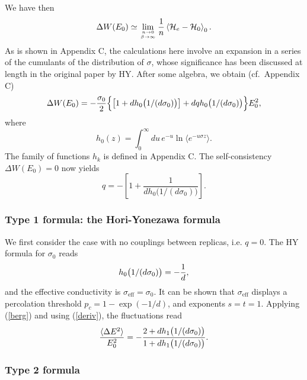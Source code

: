 We have then
\begin{equation}
\label{dwsa}
\Delta W(E_0)\simeq\lim_{n\to 0\atop \beta\to\infty}\frac{1}{n}
\left\langle
{\cal H}_e-{\cal H}_0\right\rangle_0.
\end{equation}
As is shown in Appendix C, the calculations here involve an expansion
in a series of the cumulants of the distribution of $\sigma$, whose
significance has been discussed at length in the original paper by
HY\cite{HORI77}. After some algebra, we obtain (cf.\ Appendix C)
\begin{equation}
\label{fmfodeu}
\Delta W(E_0)
=-{\sigma_0\over 2}\Bigl\{\left[1+d h_0
\bigl(1/(d\sigma_0)\bigr)\right]+d q h_0 
\bigl(1/(d\sigma_0)\bigr)\Bigr\}E_0^2,
\end{equation}
where
\begin{equation}
h_0(z)=\int_0^{\infty}du\, e^{-u}\ln\langle e^{-u\sigma z}\rangle.
\end{equation}
The family of functions $h_k$ is defined in Appendix C. 
The self-consistency $\Delta W(E_0)=0$ now yields
\begin{equation}
\label{q}
q=-\left[1+\frac{1}{d h_0
\bigl(1/(d\sigma_0)\bigr)}\right].
\end{equation}
  
\subsubsection{Type 1 formula: the Hori-Yonezawa formula}
\label{thfr}

We first consider the case with no couplings between replicas,
i.e. $q=0$. The HY formula for $\sigma_0$ reads
\begin{equation}
\label{hy}
h_0 \bigl(1/(d\sigma_0)\bigr)=-{1\over d},
\end{equation}
and the effective conductivity is $\sigma_{\text{eff}}=\sigma_0$. 
It can be shown that $\sigma_{\text{eff}}$ displays a percolation 
threshold
$p_c=1-\exp(-1/d)$, and exponents $s=t=1$\cite{HORI77}. 
Applying (\ref{berg})  and using (\ref{deriv}), the fluctuations read
\begin{equation}
\frac{\langle\Delta E^2\rangle}{E_0^2}=
-{2 +d h_1\bigl(1/(d\sigma_0)\bigr)\over 1+d h_1\bigl(1/(d\sigma_0)\bigr)}.
\end{equation}

\subsubsection{Type 2 formula}
\label{nef}

